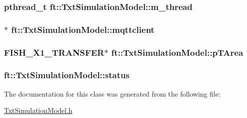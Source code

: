 \subsubsection[{\texorpdfstring{m\+\_\+thread}{m_thread}}]{\setlength{\rightskip}{0pt plus 5cm}pthread\+\_\+t ft\+::\+Txt\+Simulation\+Model\+::m\+\_\+thread\hspace{0.3cm}{\ttfamily [protected]}}\hypertarget{classft_1_1_txt_simulation_model_a18f478132d776bc303be7598a3fe32ba}{}\label{classft_1_1_txt_simulation_model_a18f478132d776bc303be7598a3fe32ba}
\subsubsection[{\texorpdfstring{mqttclient}{mqttclient}}]{$\ast$ ft\+::\+Txt\+Simulation\+Model\+::mqttclient\hspace{0.3cm}{\ttfamily [protected]}}\hypertarget{classft_1_1_txt_simulation_model_a6a92fdef8619b9b1636c7c464091ea3a}{}\label{classft_1_1_txt_simulation_model_a6a92fdef8619b9b1636c7c464091ea3a}
\subsubsection[{\texorpdfstring{p\+T\+Area}{pTArea}}]{\setlength{\rightskip}{0pt plus 5cm}F\+I\+S\+H\+\_\+\+X1\+\_\+\+T\+R\+A\+N\+S\+F\+ER$\ast$ ft\+::\+Txt\+Simulation\+Model\+::p\+T\+Area\hspace{0.3cm}{\ttfamily [protected]}}\hypertarget{classft_1_1_txt_simulation_model_a9facd66a0dbecd676ae7b72c37a0b300}{}\label{classft_1_1_txt_simulation_model_a9facd66a0dbecd676ae7b72c37a0b300}
\subsubsection[{\texorpdfstring{status}{status}}]{ ft\+::\+Txt\+Simulation\+Model\+::status\hspace{0.3cm}{\ttfamily [protected]}}\hypertarget{classft_1_1_txt_simulation_model_a4c0085e8e3c63672a1cf4230d753c7b6}{}\label{classft_1_1_txt_simulation_model_a4c0085e8e3c63672a1cf4230d753c7b6}


The documentation for this class was generated from the following file\+:\begin{DoxyCompactItemize}
\item 
\hyperlink{_txt_simulation_model_8h}{Txt\+Simulation\+Model.\+h}\end{DoxyCompactItemize}
